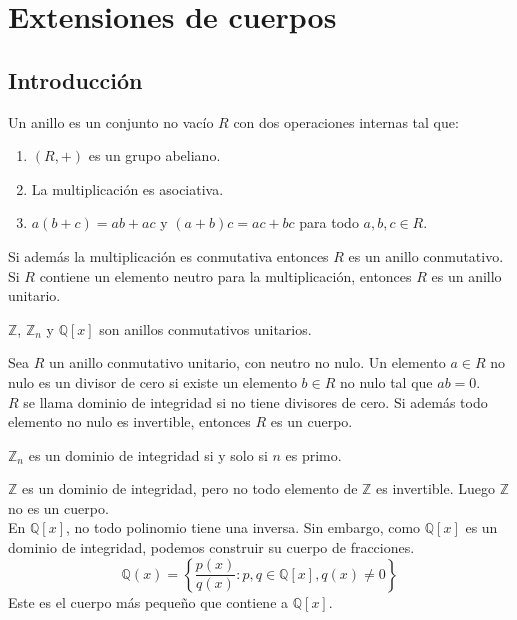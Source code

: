\chapter{Extensiones de cuerpos}
\section{Introducción}

\begin{definition}
    Un anillo es un conjunto no vacío $R$ con dos operaciones internas tal que:
    \begin{enumerate}
        \item $(R, +)$ es un grupo abeliano.
        \item La multiplicación es asociativa.
        \item $a(b + c) = ab + ac$ y $(a + b)c = ac + bc$ para todo $a, b, c \in R$.
    \end{enumerate}
    Si además la multiplicación es conmutativa entonces $R$ es un anillo conmutativo.
    Si $R$ contiene un elemento neutro para la multiplicación, entonces $R$ es un anillo unitario.
\end{definition}

\begin{example}
    $\mathbb{Z}$, $\mathbb{Z}_n$ y $\mathbb{Q}[x]$ son anillos conmutativos unitarios.
\end{example}

\begin{definition}
    Sea $R$ un anillo conmutativo unitario, con neutro no nulo.
    Un elemento $a \in R$ no nulo es un divisor de cero si existe un elemento $b \in R$ no nulo tal que $ab = 0$.\\
    $R$ se llama dominio de integridad si no tiene divisores de cero.
    Si además todo elemento no nulo es invertible, entonces $R$ es un cuerpo.
\end{definition}

\begin{example}
    $\mathbb{Z}_n$ es un dominio de integridad si y solo si $n$ es primo.
\end{example}

\begin{example}
    $\mathbb{Z}$ es un dominio de integridad, pero no todo elemento de $\mathbb{Z}$ es invertible. Luego $\mathbb{Z}$ no es un cuerpo.\\
    En $\mathbb{Q}[x]$, no todo polinomio tiene una inversa. Sin embargo, como $\mathbb{Q}[x]$ es un dominio de integridad, podemos construir su cuerpo de fracciones.
    $$\mathbb{Q}(x) = \left\{ \frac{p(x)}{q(x)} : p, q \in \mathbb{Q}[x], q(x) \neq 0 \right\}$$
    Este es el cuerpo más pequeño que contiene a $\mathbb{Q}[x]$.
\end{example}

